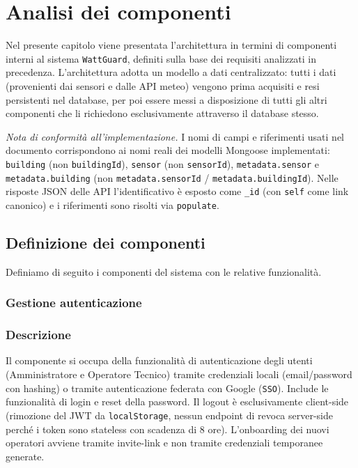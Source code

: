 \section{Analisi dei componenti}
    Nel presente capitolo viene presentata l'architettura in termini di componenti interni al sistema \texttt{WattGuard}, definiti sulla base dei requisiti analizzati in precedenza. L'architettura adotta un modello a dati centralizzato: tutti i dati (provenienti dai sensori e dalle API meteo) vengono prima acquisiti e resi persistenti nel database, per poi essere messi a disposizione di tutti gli altri componenti che li richiedono esclusivamente attraverso il database stesso.

    \textit{Nota di conformit\`a all'implementazione.} I nomi di campi e riferimenti usati nel documento corrispondono ai nomi reali dei modelli Mongoose implementati: \texttt{building} (non \texttt{buildingId}), \texttt{sensor} (non \texttt{sensorId}), \texttt{metadata.sensor} e \texttt{metadata.building} (non \texttt{metadata.sensorId} / \texttt{metadata.buildingId}). Nelle risposte JSON delle API l'identificativo \`e esposto come \texttt{\_id} (con \texttt{self} come link canonico) e i riferimenti sono risolti via \texttt{populate}.

\subsection{Definizione dei componenti}
    Definiamo di seguito i componenti del sistema con le relative funzionalità.
    
    \subsubsection{Gestione autenticazione}
        \subsubsection*{Descrizione} 
            Il componente si occupa della funzionalità di autenticazione degli utenti (Amministratore e Operatore Tecnico) tramite credenziali locali (email/password con hashing) o tramite autenticazione federata con Google (\texttt{SSO}). Include le funzionalità di login e reset della password. Il logout \`e esclusivamente client-side (rimozione del JWT da \texttt{localStorage}, nessun endpoint di revoca server-side perch\'e i token sono stateless con scadenza di 8 ore). L'onboarding dei nuovi operatori avviene tramite invite-link e non tramite credenziali temporanee generate.
